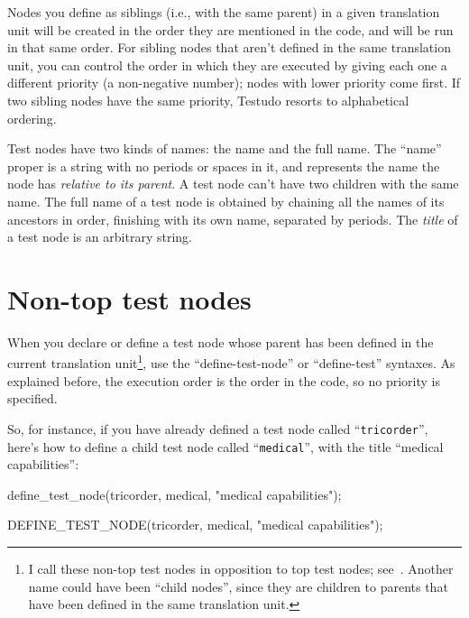 \documentclass[twoside, a4paper, article]{memoir}
\begin{document}
Nodes you define as siblings (i.e., with the same parent) in a given
translation unit will be created in the order they are mentioned in the code,
and will be run in that same order.  For sibling nodes that aren't defined in
the same translation unit, you can control the order in which they are executed
by giving each one a different priority (a non-negative number); nodes with
lower priority come first.  If two sibling nodes have the same priority,
Testudo resorts to alphabetical ordering.

Test nodes have two kinds of names: the name and the full name.  The ``name''
proper is a string with no periods or spaces in it, and represents the name the
node has \emph{relative to its parent}.  A test node can't have two children
with the same name.  The full name of a test node is obtained by chaining all
the names of its ancestors in order, finishing with its own name, separated by
periods.  The \emph{title} of a test node is an arbitrary string.

\section{Non-top test nodes}
\label{sec:non-top-test-nodes}

When you declare or define a test node whose parent has been defined in the
current translation unit\footnote{I call these non-top test nodes in opposition
  to top test nodes; see~.  Another name could have
  been ``child nodes'', since they are children to parents that have been
  defined in the same translation unit.}, use the ``define-test-node'' or
``define-test'' syntaxes.  As explained before, the execution order is the
order in the code, so no priority is specified.

So, for instance, if you have already defined a test node called
``\texttt{tricorder}'', here's how to define a child test node called
``\texttt{medical}'', with the title ``medical capabilities'':
\begin{cpplisting}
define_test_node(tricorder, medical, "medical capabilities");
\end{cpplisting}

\begin{cpplisting}
DEFINE_TEST_NODE(tricorder, medical, "medical capabilities");
\end{cpplisting}
\end{document}
